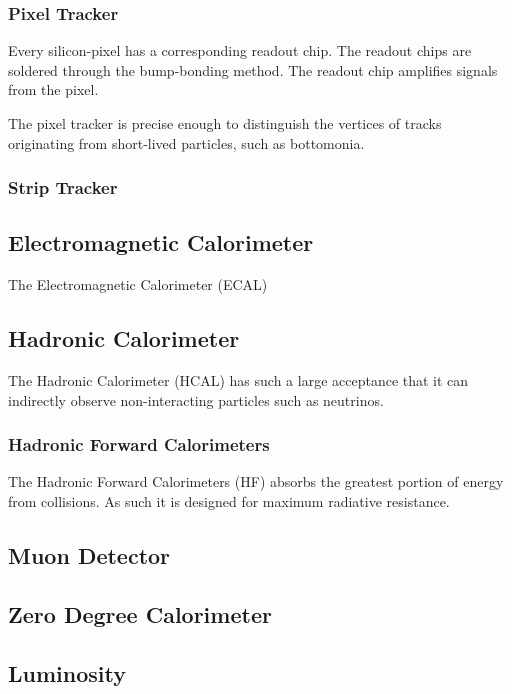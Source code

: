 \subsubsection{Pixel Tracker}

Every silicon-pixel has a corresponding readout chip. The readout chips are soldered through the bump-bonding method. The readout chip amplifies signals from the pixel.

The pixel tracker is precise enough to distinguish the vertices of tracks originating from short-lived particles, such as bottomonia. 

\subsubsection{Strip Tracker}

\subsection{Electromagnetic Calorimeter}

The Electromagnetic Calorimeter (ECAL)

\subsection{Hadronic Calorimeter}

The Hadronic Calorimeter (HCAL) has such a large acceptance that it can indirectly observe non-interacting particles such as neutrinos.


\subsubsection{Hadronic Forward Calorimeters}

The Hadronic Forward Calorimeters (HF) absorbs the greatest portion of energy from collisions. As such it is designed for maximum radiative resistance.

\subsection{Muon Detector}

\subsection{Zero Degree Calorimeter}

\subsection{Luminosity}

